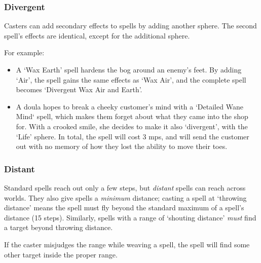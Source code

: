 \begin{multicols}{2}
\subsubsection{Divergent}

Casters can add secondary effects to spells by adding another sphere.
The second spell's effects are identical, except for the additional sphere.

For example:

\begin{itemize}
  \item
  A `Wax Earth' spell hardens the bog around an enemy's feet.
  By adding `Air', the spell gains the same effects as `Wax Air', and the complete spell becomes `Divergent Wax Air and Earth'.
  \item
  A doula hopes to break a cheeky customer's mind with a `Detailed Wane Mind` spell, which makes them forget about what they came into the shop for.
  With a crooked smile, she decides to make it also `divergent', with the `Life' sphere.
  In total, the spell will cost 3 \glspl{mp}, and will send the customer out with no memory of how they lost the ability to move their toes.
\end{itemize}

\subsubsection{Distant}

Standard spells reach out only a few steps, but \textit{distant} spells can reach across worlds.
They also give spells a \emph{minimum} distance; casting a spell at `throwing distance' means the spell must fly beyond the standard maximum of a spell's distance (15 steps).
Similarly, spells with a range of `shouting distance' \emph{must} find a target beyond throwing distance.


If the caster misjudges the range while weaving a spell, the spell will find some other target inside the proper range.


\end{multicols}
